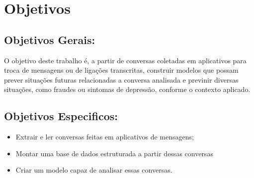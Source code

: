 \documentclass[a4paper, 12pt]{article}
\begin{document}
  \tableofcontents{}
  \break

  \section{Objetivos}

    \subsection{Objetivos Gerais:}

    \hfill\newline
    O objetivo deste trabalho é, a partir de conversas coletadas em aplicativos para troca de mensagens ou de ligações transcritas, construir modelos que possam prever situações futuras relacionadas a conversa analisada e previnir diversas situações, como fraudes ou sintomas de depressão, conforme o contexto aplicado.


    \hfill\newline
    \subsection{Objetivos Especificos:}

    \begin{itemize}
        \item Extrair e ler conversas feitas em aplicativos de mensagens;
        \item Montar uma base de dados estruturada a partir dessas conversas
        \item Criar um modelo capaz de analisar essas conversas.
      \end{itemize}
\end{document}
